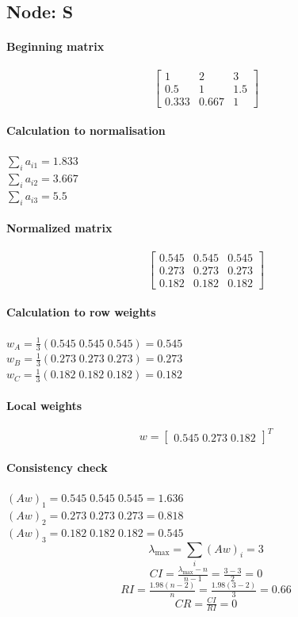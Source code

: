 \subsection*{Node: S}
\paragraph{Beginning matrix}
\[\begin{bmatrix}
1 & 2 & 3 \\
0.5 & 1 & 1.5 \\
0.333 & 0.667 & 1
\end{bmatrix}\]
\paragraph{Calculation to normalisation}
\(\sum_i a_{i1} = 1.833\) \\ \(\sum_i a_{i2} = 3.667\) \\ \(\sum_i a_{i3} = 5.5\)
\paragraph{Normalized matrix}
\[\begin{bmatrix}
0.545 & 0.545 & 0.545 \\
0.273 & 0.273 & 0.273 \\
0.182 & 0.182 & 0.182
\end{bmatrix}\]
\paragraph{Calculation to row weights}
\(w_{A} = \tfrac{1}{3}(0.545 \; 0.545 \; 0.545) = 0.545\) \\ \(w_{B} = \tfrac{1}{3}(0.273 \; 0.273 \; 0.273) = 0.273\) \\ \(w_{C} = \tfrac{1}{3}(0.182 \; 0.182 \; 0.182) = 0.182\)
\paragraph{Local weights}
\[w = \begin{bmatrix} 0.545 \; 0.273 \; 0.182 \end{bmatrix}^{\!T}\]
\paragraph{Consistency check}
\((Aw)_{1} = 0.545 \; 0.545 \; 0.545 = 1.636\) \\ \((Aw)_{2} = 0.273 \; 0.273 \; 0.273 = 0.818\) \\ \((Aw)_{3} = 0.182 \; 0.182 \; 0.182 = 0.545\)
\[\lambda_{\max} = \sum_i (Aw)_i = 3\]
\[CI = \tfrac{\lambda_{\max}-n}{n-1} = \tfrac{3 - 3}{2} = 0\]
\[RI = \tfrac{1.98(n-2)}{n} = \tfrac{1.98(3-2)}{3} = 0.66\]
\[CR = \tfrac{CI}{RI} = 0\]
